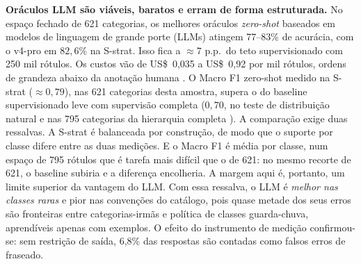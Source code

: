 \textbf{Oráculos LLM são viáveis, baratos e erram de forma estruturada.}
No espaço fechado de 621 categorias, os melhores oráculos \textit{zero-shot}
baseados em modelos de linguagem de grande porte (LLMs) atingem 77--83\% de
acurácia, com o v4-pro em $82{,}6\%$ na S-strat. Isso fica a $\approx 7$ p.p.\
do teto supervisionado com 250 mil rótulos. Os custos vão de US\$~0,035 a
US\$~0,92 por mil rótulos, ordens de grandeza abaixo da anotação humana
\citep{Gilardi2023}. O Macro F1 zero-shot medido na S-strat ($\approx 0{,}79$), nas 621 categorias
desta amostra, supera o do baseline supervisionado leve com supervisão
completa ($0{,}70$, no teste de distribuição natural e nas 795 categorias da
hierarquia completa \citep{Daru2024Dissertacao}). A comparação exige duas
ressalvas. A S-strat é balanceada por construção, de modo que o suporte por
classe difere entre as duas medições. E o Macro F1 é média por classe, num
espaço de 795 rótulos que é tarefa mais difícil que o de 621: no mesmo
recorte de 621, o baseline subiria e a diferença encolheria. A margem aqui é,
portanto, um limite superior da vantagem do LLM. Com essa ressalva, o LLM é \emph{melhor nas classes
raras} e pior nas convenções do catálogo, pois quase metade dos seus erros são
fronteiras entre categorias-irmãs e política de classes guarda-chuva,
aprendíveis apenas com exemplos. O efeito do instrumento de medição
confirmou-se: sem restrição de saída, 6,8\% das respostas são contadas como
falsos erros de fraseado.

